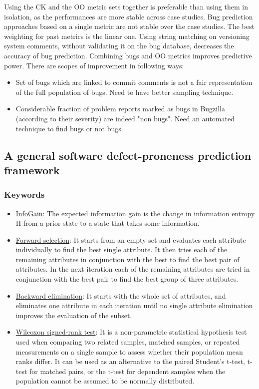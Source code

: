 \documentclass[conference]{IEEEtran}
\begin{document}
Using the CK and the OO metric sets together is preferable than using them in isolation, as the performances are more stable across case studies. Bug prediction approaches based on a single metric are not stable over the case studies. The best weighting for past metrics is the linear one. Using string matching on versioning system comments, without validating it on the bug database, decreases the accuracy of bug prediction. Combining bugs and OO metrics improves predictive power. There are scopes of improvement in following ways:
\begin{itemize}
    \item Set of bugs which are linked to commit comments is not a fair representation of the full population of bugs. Need to have better sampling technique.
    \item Considerable fraction of problem reports marked as bugs in Bugzilla (according to their severity) are indeed "non bugs". Need an automated technique to find bugs or not bugs.
\end{itemize}

\subsection{\textbf{A general software defect-proneness prediction framework~\cite{song2011general}}}
\subsubsection{\textbf{Keywords}}
\begin{itemize}
    \item \underline{InfoGain}: The expected information gain is the change in information entropy {H} from a prior state to a state that takes some information.
    \item \underline{Forward selection}:  It starts from an empty set and evaluates each attribute individually to find the best single attribute. It then tries each of the remaining attributes in conjunction with the best to find the best pair of attributes. In the next iteration each of the remaining attributes are tried in conjunction with the best pair to find the best group of three attributes. 
    \item \underline{Backward elimination}: It starts with the whole set of attributes, and eliminates one attribute in each iteration until no single attribute elimination improves the evaluation of the subset.
    \item \underline{Wilcoxon signed-rank test}: It is a non-parametric statistical hypothesis test used when comparing two related samples, matched samples, or repeated measurements on a single sample to assess whether their population mean ranks differ. It can be used as an alternative to the paired Student's t-test, t-test for matched pairs, or the t-test for dependent samples when the population cannot be assumed to be normally distributed.
\end{itemize}
\end{document}

